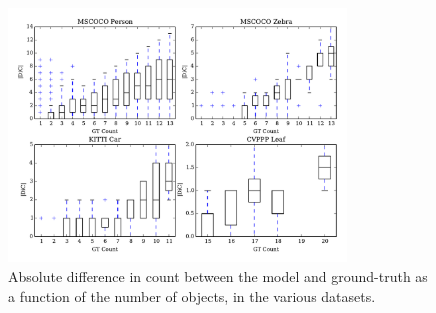 \begin{figure}[h]
\centering
\includegraphics[width=0.8\textwidth]{figs/count.pdf}
\caption{Absolute difference in count between the model and ground-truth as 
a function of the number of objects, in the various datasets.}
\label{fig:count}
\end{figure}
